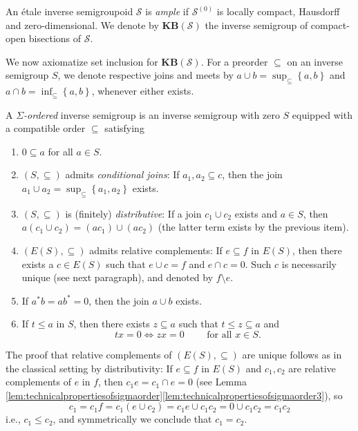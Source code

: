 \begin{definition}
    An étale inverse semigroupoid $\mathcal{S}$ is \emph{ample} if $\mathcal{S}^{(0)}$ is locally compact, Hausdorff and zero-dimensional. We denote by $\mathbf{KB}(\mathcal{S})$ the inverse semigroup of compact-open bisections of $\mathcal{S}$.
\end{definition}

We now axiomatize set inclusion for $\mathbf{KB}(\mathcal{S})$. For a preorder $\subseteq$ on an inverse semigroup $S$, we denote respective joins and meets by $a\cup b=\sup_{\subseteq}\left\{a,b\right\}$ and $a\cap b=\inf_{\subseteq}\left\{a,b\right\}$, whenever either exists.

\begin{definition}\label{def:sigmaorder}
A \emph{$\Sigma$-ordered} inverse semigroup is an inverse semigroup with zero $S$ equipped with a compatible order $\subseteq$ satisfying
\begin{enumerate}[label=(Σ-\roman*)]
    \item\label{def:sigmaorder.0minimum} $0\subseteq a$ for all $a\in S$.
    \item\label{def:sigmaorder.conditionaljoins} $(S,\subseteq)$ admits \emph{conditional joins}: If $a_1,a_2\subseteq c$, then the join $a_1\cup a_2=\sup_{\subseteq}\left\{a_1,a_2\right\}$ exists.
    \item\label{def:sigmaorder.distributivity} $(S,\subseteq)$ is (finitely) \emph{distributive}: If a join $c_1\cup c_2$ exists and $a\in S$, then $a(c_1\cup c_2)=(ac_1)\cup (ac_2)$ (the latter term exists by the previous item).
    \item\label{def:sigmaorder.ESrelativecomplements} $(E(S),\subseteq)$ admits relative complements: If $e\subseteq f$ in $E(S)$, then there exists a $c\in E(S)$ such that $e\cup c=f$ and $e\cap c=0$. Such $c$ is necessarily unique (see next paragraph), and denoted by $f\setminus e$.
    \item\label{def:sigmaorder.zerojoins} If $a^*b=ab^*=0$, then the join $a\cup b$ exists.
    \item\label{def:sigmaorder.interpolation} If $t\leq a$ in $S$, then there exists $z\subseteq a$ such that $t\leq z\subseteq a$ and
    \[tx=0\iff zx=0\qquad\text{ for all }x\in S.\]
\end{enumerate}
\end{definition}

The proof that relative complements of $(E(S),\subseteq)$ are unique follows as in the classical setting by distributivity: If $e\subseteq f$ in $E(S)$ and $c_1,c_2$ are relative complements of $e$ in $f$, then $c_1e=c_1\cap e=0$ (see Lemma \ref{lem:technicalpropertiesofsigmaorder}\ref{lem:technicalpropertiesofsigmaorder3}), so
\[c_1=c_1f=c_1(e\cup c_2)=c_1e\cup c_1c_2=0\cup c_1c_2=c_1c_2\]
i.e., $c_1\leq c_2$, and symmetrically we conclude that $c_1=c_2$.

